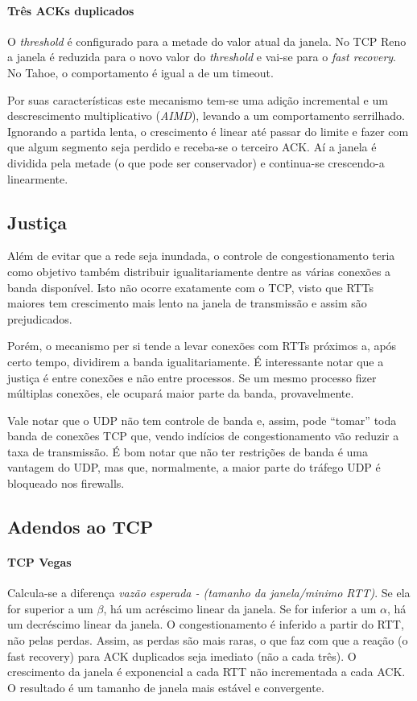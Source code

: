 \paragraph{Três ACKs duplicados} O \emph{threshold} é configurado para a metade do valor atual da janela. No TCP Reno a janela é reduzida para o novo valor do \emph{threshold} e vai-se para o \emph{fast recovery}. No Tahoe, o comportamento é igual a de um timeout.

Por suas características este mecanismo tem-se uma adição incremental e um descrescimento multiplicativo (\emph{AIMD}), 
levando a um comportamento serrilhado.
Ignorando a partida lenta, o crescimento é linear até passar do limite e fazer com que algum segmento seja perdido e receba-se o terceiro ACK.
Aí a janela é dividida pela metade (o que pode ser conservador) e continua-se crescendo-a linearmente.

\subsection{Justiça}

Além de evitar que a rede seja inundada, o controle de congestionamento teria como objetivo também distribuir igualitariamente dentre as várias conexões a banda disponível.
Isto não ocorre exatamente com o TCP, visto que RTTs maiores tem crescimento mais lento na janela de transmissão e assim são prejudicados.

Porém, o mecanismo per si tende a levar conexões com RTTs próximos a, após certo tempo, dividirem a banda igualitariamente.
É interessante notar que a justiça é entre conexões e não entre processos. Se um mesmo processo fizer múltiplas conexões, ele ocupará maior parte da banda, provavelmente.

Vale notar que o UDP não tem controle de banda e, assim, pode ``tomar'' toda banda de conexões TCP que, vendo indícios de congestionamento vão reduzir a taxa de transmissão.
É bom notar que não ter restrições de banda é uma vantagem do UDP, mas que, normalmente, a maior parte do tráfego UDP é bloqueado nos firewalls.

\subsection{Adendos ao TCP}

\paragraph{TCP Vegas} Calcula-se a diferença \emph{vazão esperada - (tamanho da janela/minimo RTT)}. 
Se ela for superior a um $\beta$, há um acréscimo linear da janela.
Se for inferior a um $\alpha$, há um decréscimo linear da janela.
O congestionamento é inferido a partir do RTT, não pelas perdas.
Assim, as perdas são mais raras, o que faz com que a reação (o fast recovery) para ACK duplicados seja imediato (não a cada três).
O crescimento da janela é exponencial a cada RTT não incrementada a cada ACK.
O resultado é um tamanho de janela mais estável e convergente.

